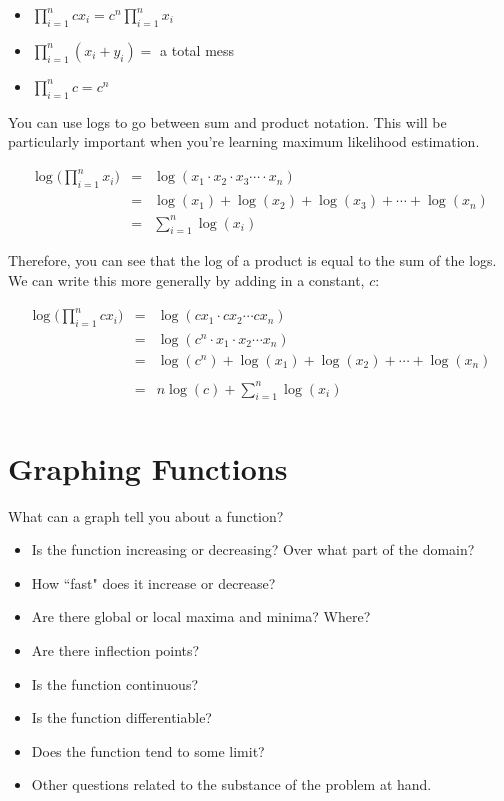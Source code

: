 \documentclass[]{book}
\providecommand{\tightlist}{%
  \setlength{\itemsep}{0pt}\setlength{\parskip}{0pt}}
\theoremstyle{definition}
\theoremstyle{definition}
\theoremstyle{definition}
\theoremstyle{remark}
\begin{document}
\begin{itemize}
\item $\prod\limits_{i=1}^n c x_i = c^n \prod\limits_{i=1}^n x_i $
\item $\prod\limits_{i=1}^n (x_i + y_i) =$ a total mess
\item $\prod\limits_{i=1}^n c = c^n $
\end{itemize}

You can use logs to go between sum and product notation. This will be
particularly important when you're learning maximum likelihood
estimation.

\begin{eqnarray*}
            \log \bigg(\prod\limits_{i=1}^n x_i \bigg) &=& \log(x_1 \cdot x_2 \cdot x_3 \cdots \cdot x_n)\\
            &=& \log(x_1) + \log(x_2) + \log(x_3) + \cdots + \log(x_n)\\
            &=& \sum\limits_{i=1}^n \log (x_i)
\end{eqnarray*}

Therefore, you can see that the log of a product is equal to the sum of
the logs. We can write this more generally by adding in a constant,
\(c\):

\begin{eqnarray*}
            \log \bigg(\prod\limits_{i=1}^n c x_i\bigg) &=& \log(cx_1 \cdot cx_2 \cdots cx_n)\\
            &=& \log(c^n \cdot x_1 \cdot x_2 \cdots x_n)\\
            &=& \log(c^n) + \log(x_1) + \log(x_2) + \cdots + \log(x_n)\\\\
            &=& n \log(c) +  \sum\limits_{i=1}^n \log (x_i)\\
\end{eqnarray*}

\section{Graphing Functions}\label{graphing-functions}

What can a graph tell you about a function?

\begin{itemize}
\tightlist
\item
  Is the function increasing or decreasing? Over what part of the
  domain?
\item
  How ``fast" does it increase or decrease?
\item
  Are there global or local maxima and minima? Where?
\item
  Are there inflection points?
\item
  Is the function continuous?
\item
  Is the function differentiable?
\item
  Does the function tend to some limit?
\item
  Other questions related to the substance of the problem at hand.
\end{itemize}
\end{document}

